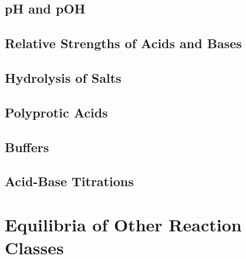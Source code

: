 \documentclass[12pt, openany, letterpaper]{memoir}
\begin{document}
\section{pH and pOH}

\section{Relative Strengths of Acids and Bases}

\section{Hydrolysis of Salts}

\section{Polyprotic Acids}

\section{Buffers}

\section{Acid-Base Titrations}

\chapter{Equilibria of Other Reaction Classes}
\end{document}
